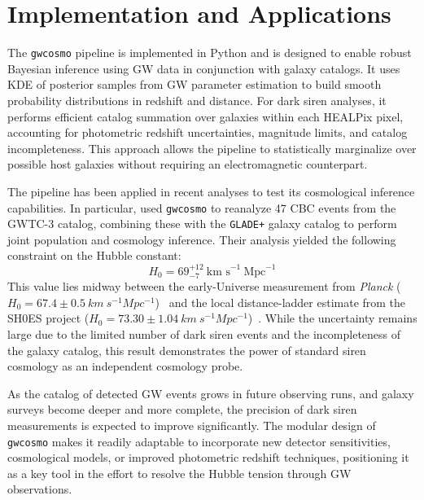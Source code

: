 \section{Implementation and Applications}

%

The \texttt{gwcosmo} pipeline is implemented in Python and is designed to enable robust Bayesian inference using \ac{GW} data in conjunction with galaxy catalogs. It uses \ac{KDE} of posterior samples from \ac{GW} parameter estimation to build smooth probability distributions in redshift and distance. For dark siren analyses, it performs efficient catalog summation over galaxies within each HEALPix pixel, accounting for photometric redshift uncertainties, magnitude limits, and catalog incompleteness. This approach allows the pipeline to statistically marginalize over possible host galaxies without requiring an electromagnetic counterpart.

The pipeline has been applied in recent analyses to test its cosmological inference capabilities. In particular, \citet{gray2023joint} used \texttt{gwcosmo} to reanalyze 47 \ac{CBC} events from the \ac{GWTC}-3 catalog, combining these with the \texttt{GLADE+} galaxy catalog to perform joint population and cosmology inference. Their analysis yielded the following constraint on the Hubble constant:
$$
H_0 = 69^{+12}_{-7}~\text{km s}^{-1}~\text{Mpc}^{-1}
$$
This value lies midway between the early-Universe measurement from \textit{Planck} ($H_0 = 67.4 \pm 0.5~km~s^{-1}Mpc^{-1}$)~\citep{Planck:2018vyg} and the local distance-ladder estimate from the \ac{SH0ES} project ($H_0 = 73.30 \pm 1.04~km~s^{-1}Mpc^{-1}$)~\citep{riess2022comprehensive}. While the uncertainty remains large due to the limited number of dark siren events and the incompleteness of the galaxy catalog, this result demonstrates the power of standard siren cosmology as an independent cosmology probe.

As the catalog of detected \ac{GW} events grows in future observing runs, and galaxy surveys become deeper and more complete, the precision of dark siren measurements is expected to improve significantly. The modular design of \texttt{gwcosmo} makes it readily adaptable to incorporate new detector sensitivities, cosmological models, or improved photometric redshift techniques, positioning it as a key tool in the effort to resolve the Hubble tension through \ac{GW} observations.

